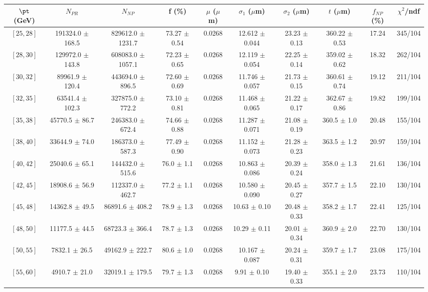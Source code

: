 \begin{tabular}{c||c|c|c|c|c|c|c||c|c}
$\pt$ (GeV) & $N_{PR}$ & $N_{NP}$ & f (\%) & $\mu$ ($\mu$m) & $\sigma_1$ ($\mu$m) & $\sigma_2$ ($\mu$m)  & $t$ ($\mu$m) & $f_{NP}$ (\%) & $\chi^2$/ndf \\
\hline
$[25, 28]$ & 191324.0 $\pm$ 168.5 & 829612.0 $\pm$ 1231.7 & 73.27 $\pm$ 0.54 & 0.0268 & 12.612 $\pm$ 0.044 & 23.23 $\pm$ 0.13 & 360.22 $\pm$ 0.53 & 17.24 & 345/104\\
$[28, 30]$ & 129972.0 $\pm$ 143.8 & 608083.0 $\pm$ 1057.1 & 72.23 $\pm$ 0.65 & 0.0268 & 12.119 $\pm$ 0.054 & 22.25 $\pm$ 0.14 & 359.02 $\pm$ 0.62 & 18.32 & 262/104\\
$[30, 32]$ & 89961.9 $\pm$ 120.4 & 443694.0 $\pm$ 896.5 & 72.60 $\pm$ 0.69 & 0.0268 & 11.746 $\pm$ 0.057 & 21.73 $\pm$ 0.15 & 360.61 $\pm$ 0.74 & 19.12 & 211/104\\
$[32, 35]$ & 63541.4 $\pm$ 102.3 & 327875.0 $\pm$ 772.2 & 73.10 $\pm$ 0.81 & 0.0268 & 11.468 $\pm$ 0.065 & 21.22 $\pm$ 0.17 & 362.67 $\pm$ 0.86 & 19.82 & 199/104\\
$[35, 38]$ & 45770.5 $\pm$ 86.7 & 246383.0 $\pm$ 672.4 & 74.66 $\pm$ 0.88 & 0.0268 & 11.287 $\pm$ 0.071 & 21.08 $\pm$ 0.19 & 360.5 $\pm$ 1.0 & 20.48 & 155/104\\
$[38, 40]$ & 33644.9 $\pm$ 74.0 & 186373.0 $\pm$ 587.3 & 77.49 $\pm$ 0.90 & 0.0268 & 11.152 $\pm$ 0.073 & 21.28 $\pm$ 0.23 & 363.5 $\pm$ 1.2 & 20.97 & 159/104\\
$[40, 42]$ & 25040.6 $\pm$ 65.1 & 144432.0 $\pm$ 515.6 & 76.0 $\pm$ 1.1 & 0.0268 & 10.863 $\pm$ 0.086 & 20.39 $\pm$ 0.24 & 358.0 $\pm$ 1.3 & 21.61 & 136/104\\
$[42, 45]$ & 18908.6 $\pm$ 56.9 & 112337.0 $\pm$ 462.7 & 77.2 $\pm$ 1.1 & 0.0268 & 10.580 $\pm$ 0.090 & 20.45 $\pm$ 0.27 & 357.7 $\pm$ 1.5 & 22.10 & 130/104\\
$[45, 48]$ & 14362.8 $\pm$ 49.5 & 86891.6 $\pm$ 408.2 & 78.9 $\pm$ 1.3 & 0.0268 & 10.63 $\pm$ 0.10 & 20.48 $\pm$ 0.33 & 358.2 $\pm$ 1.7 & 22.41 & 125/104\\
$[48, 50]$ & 11177.5 $\pm$ 44.5 & 68723.3 $\pm$ 366.4 & 78.7 $\pm$ 1.3 & 0.0268 & 10.29 $\pm$ 0.11 & 20.01 $\pm$ 0.34 & 360.9 $\pm$ 2.0 & 22.70 & 130/104\\
$[50, 55]$ & 7832.1 $\pm$ 26.5 & 49162.9 $\pm$ 222.7 & 80.6 $\pm$ 1.0 & 0.0268 & 10.167 $\pm$ 0.087 & 20.24 $\pm$ 0.31 & 359.7 $\pm$ 1.7 & 23.08 & 175/104\\
$[55, 60]$ & 4910.7 $\pm$ 21.0 & 32019.1 $\pm$ 179.5 & 79.7 $\pm$ 1.3 & 0.0268 & 9.91 $\pm$ 0.10 & 19.40 $\pm$ 0.33 & 355.1 $\pm$ 2.0 & 23.73 & 110/104\\

\end{tabular}
